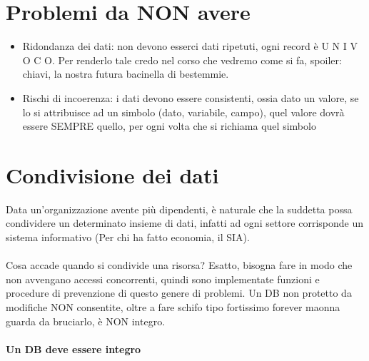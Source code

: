 \documentclass[12pt, a4paper, openany, twoside]{book}
\begin{document}
\section{Problemi da NON avere}
\begin{itemize}
	\item Ridondanza dei dati: non devono esserci dati ripetuti, ogni record è
	U N I V O C O. Per renderlo tale credo nel corso che vedremo come si fa, 
	spoiler: chiavi, la nostra futura bacinella di bestemmie.
	\item Rischi di incoerenza: i dati devono essere consistenti, ossia dato un
	valore, se lo si attribuisce ad un simbolo (dato, variabile, campo), quel
	valore dovrà essere SEMPRE quello, per ogni volta che si richiama quel 
	simbolo
\end{itemize}
\section{Condivisione dei dati}
Data un'organizzazione avente più dipendenti, è naturale che la suddetta possa
condividere un determinato insieme di dati, infatti ad ogni settore corrisponde
un sistema informativo (Per chi ha fatto economia, il SIA).\\ \\
Cosa accade quando si condivide una risorsa? Esatto, bisogna fare in modo che
non avvengano accessi concorrenti, quindi sono implementate funzioni e 
procedure di prevenzione di questo genere di problemi. Un DB non protetto da
modifiche NON consentite, oltre a fare schifo tipo fortissimo forever maonna guarda
da bruciarlo, è NON integro. 
\paragraph{Un DB deve essere integro}
\end{document}
